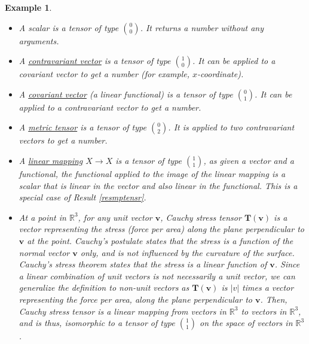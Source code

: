\documentclass[letterpaper,12pt]{article}
\theoremstyle{plain}
\theoremstyle{plain}
\newtheorem{exmp}{Example}
\theoremstyle{definition}
\begin{document}
\begin{exmp} \leavevmode
\begin{itemize}
\item A scalar is a tensor of type $\binom{0}{0}$. It returns a number without any arguments.
\item A \hyperref[defcoco]{contravariant vector} is a tensor of type $\binom{1}{0}$. It can be applied to a covariant vector to get a number (for example, $x$-coordinate).
\item A \hyperref[defcoco]{covariant vector} (a linear functional) is a tensor of type $\binom{0}{1}$. It can be applied to a contravariant vector to get a number.
\item A \hyperref[defmettns]{metric tensor} is a tensor of type $\binom{0}{2}$. It is applied to two contravariant vectors to get a number. 
\item A \hyperref[deflinfvs]{linear mapping} $X\rightarrow X$ is a tensor of type $\binom{1}{1}$, as given a vector and a functional, the functional applied to the image of the linear mapping is a scalar that is linear in the vector and also linear in the functional. This is a special case of Result \ref{resmptensr}.
\item At a point in $\mathbb{R}^3$, for any unit vector $\mathbf{v}$, Cauchy stress tensor $\mathbf{T}(\mathbf{v})$ is a vector representing the stress (force per area) along the plane perpendicular to $\mathbf{v}$ at the point. Cauchy's postulate states that the stress is a function of the normal vector $\mathbf{v}$ only, and is not influenced by the curvature of the surface. Cauchy's stress theorem states that the stress is a linear function of $\mathbf{v}$. Since a linear combination of unit vectors is not necessarily a unit vector, we can generalize the definition to non-unit vectors as $\mathbf{T}(\mathbf{v})$ is $|v|$ times a vector representing the force per area, along the plane perpendicular to $\mathbf{\mathbf{v}}$. Then, Cauchy stress tensor is a linear mapping from vectors in $\mathbb{R}^3$ to vectors in $\mathbb{R}^3$, and is thus, isomorphic to a tensor of type $\binom{1}{1}$ on the space of vectors in $\mathbb{R}^3$.
\end{itemize}
\end{exmp}
\end{document}
